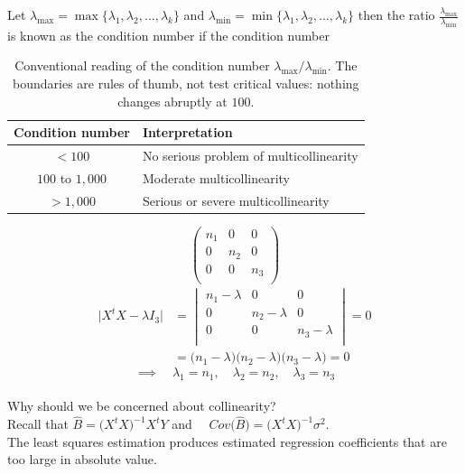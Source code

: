\documentclass[11pt,a4paper]{article}
\theoremstyle{definition}
\begin{document}
Let $\lambda_{\max}=\max\{\lambda_1,\lambda_2,\ldots ,\lambda_k\}$ and $\lambda_{\min}=\min\{\lambda_1,\lambda_2,\ldots ,\lambda_k\}$ then the ratio $\frac{\lambda_{\max}}{\lambda_{\min}}$ is known as the condition number if the condition number
\begin{table}[H]
\centering
\begin{tabular}{|c|l|}
\hline
\textbf{Condition number} & \textbf{Interpretation}\\
\hline
$<100$ & No serious problem of multicollinearity\\
$100$ to $1{,}000$ & Moderate multicollinearity\\
$>1{,}000$ & Serious or severe multicollinearity\\
\hline
\end{tabular}
\caption{Conventional reading of the condition number
$\lambda_{\max}/\lambda_{\min}$. The boundaries are rules of thumb, not test
critical values: nothing changes abruptly at $100$.}
\label{tab:conditionnumber}
\end{table}

$$
\begin{pmatrix}
n_1 & 0 & 0\\
0 & n_2 & 0\\
0 & 0 & n_3\\
\end{pmatrix}
$$
\begin{align*}
\Big|X^tX-\lambda I_3\Big| & = 
\begin{vmatrix}
n_1-\lambda & 0 & 0\\
0 & n_2-\lambda & 0\\
0 & 0 & n_3-\lambda\\
\end{vmatrix}
=0\\
                          & = \big(n_1-\lambda\big)\big(n_2-\lambda\big)\big(n_3-\lambda\big)=0
\end{align*}
$$\implies \quad  \lambda_1= n_1,\quad  \lambda_2=n_2,\quad  \lambda_3=n_3$$\\

Why should we be concerned about collinearity?\\

Recall that $\widehat{B}=\big(X^tX\big)^{-1}X^tY$ and $\quad  Cov\big(\widehat{B}\big)=\big(X^tX\big)^{-1}\sigma^2$.\\

The least squares estimation produces estimated regression coefficients that are too large in absolute value.\\
\end{document}
